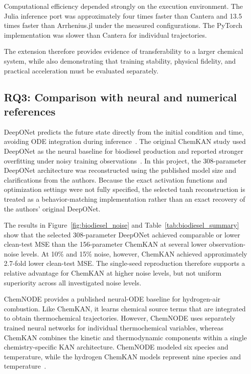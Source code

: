 \documentclass[11pt,a4paper]{article}
\begin{document}
Computational efficiency depended strongly on the
execution environment. The Julia inference port
was approximately four times faster than Cantera
and 13.5 times faster than Arrhenius.jl under the
measured configurations. The PyTorch implementation
was slower than Cantera for individual trajectories.

The extension therefore provides evidence of
transferability to a larger chemical system,
while also demonstrating that training stability,
physical fidelity, and practical acceleration
must be evaluated separately.



\subsection{RQ3: Comparison with neural and numerical references}

DeepONet predicts the future state directly from
the initial condition and time, avoiding ODE
integration during inference~\cite{lu2019deeponet}.
The original ChemKAN study used DeepONet as
the neural baseline for biodiesel production
and reported stronger overfitting under noisy
training observations~\cite{Koenig_2025}.
In this project, the 308-parameter DeepONet
architecture was reconstructed using the
published model size and clarifications
from the authors. Because the exact activation
functions and optimization settings were
not fully specified, the selected tanh
reconstruction is treated as a
behavior-matching implementation rather
than an exact recovery of the authors'
original DeepONet.

The results in Figure~\ref{fig:biodiesel_noise}
and Table~\ref{tab:biodiesel_summary} show
that the selected 308-parameter DeepONet
achieved comparable or lower clean-test MSE
than the 156-parameter ChemKAN at several
lower observation-noise levels. At 10\%
and 15\% noise, however, ChemKAN achieved
approximately 2.7-fold lower clean-test MSE.
The single-seed reproduction therefore
supports a relative advantage for ChemKAN
at higher noise levels, but not uniform
superiority across all investigated noise
levels.

ChemNODE provides a published neural-ODE
baseline for hydrogen-air combustion.
Like ChemKAN, it learns chemical source
terms that are integrated to obtain
thermochemical trajectories. However,
ChemNODE uses separately trained neural
networks for individual thermochemical
variables, whereas ChemKAN combines
the kinetic and thermodynamic components
within a single chemistry-specific
KAN architecture. ChemNODE modeled six
species and temperature, while the hydrogen
ChemKAN models represent nine species and
temperature~\cite{OWOYELE2022100118,Koenig_2025}.
\end{document}
